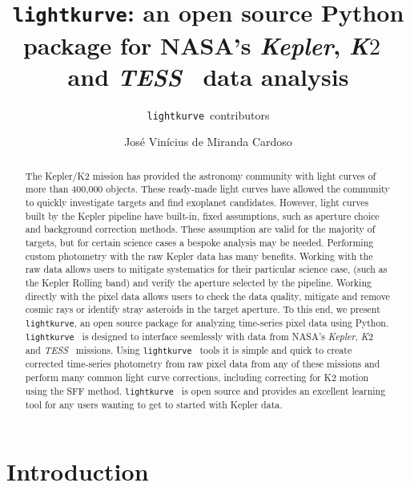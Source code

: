\documentclass[twocolumn]{aastex62}
\newcommand{\ktwo}{{\it K$\mathit{2}$}}
\newcommand{\tess}{{\it TESS}}
\newcommand{\kepler}{{\it Kepler}}
\newcommand{\lightkurve}{\texttt{lightkurve}}
\begin{document}
\title{\lightkurve: an open source Python package for NASA's \kepler, \ktwo~ and \tess~ data analysis}


\author{\lightkurve~contributors}

\author{Jos\'e Vin\'icius de Miranda Cardoso}

\begin{abstract}
The Kepler/K2 mission has provided the astronomy community with light curves of more than 400,000 objects. These ready-made light curves have allowed the community to quickly investigate targets and find exoplanet candidates. However, light curves built by the Kepler pipeline have built-in, fixed assumptions, such as aperture choice and background correction methods. These assumption are valid for the majority of targets, but for certain science cases a bespoke analysis may be needed. Performing custom photometry with the raw Kepler data has many benefits. Working with the raw data allows users to mitigate systematics for their particular science case, (such as the Kepler Rolling band) and verify the aperture selected by the pipeline. Working directly with the pixel data allows users to check the data quality, mitigate and remove cosmic rays or identify stray asteroids in the target aperture. To this end, we present \lightkurve, an open source package for analyzing time-series pixel data using Python. \lightkurve~ is designed to interface seemlessly with data from NASA's \kepler, \ktwo~ and \tess~ missions. Using \lightkurve~ tools it is simple and quick to create corrected time-series photometry from raw pixel data from any of these missions and perform many common light curve corrections, including correcting for K2 motion using the SFF method. \lightkurve~ is open source and provides an excellent learning tool for any users wanting to get to started with Kepler data.
 
\end{abstract}


\section{Introduction} \label{sec:intro}
\end{document}
